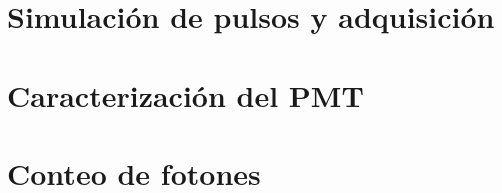 \section{Simulación de pulsos y adquisición}
\section{Caracterización del PMT}
\section{Conteo de fotones}

